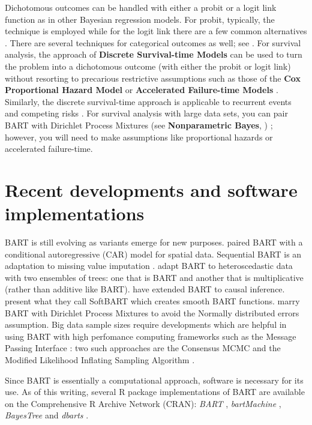 \documentclass[cmbright,doublespace]{WileySTAT-V1}
\theoremstyle{plain}
\begin{document}
Dichotomous outcomes can be handled with either a probit or a logit
link function as in other Bayesian regression models.  For probit,
typically, the \cite{AlbeChib93} technique is employed while for the
logit link there are a few common alternatives
\citep{HolmHeld06,FruhFruh10,GramPols12}.  There are several
techniques for categorical outcomes as well; see
\citep{AlbeChib93,McCuRoss94,McCuRoss00,FruhFruh10,KindWang16,Murr17}.
For survival analysis, the approach of \textbf{Discrete Survival-time
  Models} \citep{Fahr14} can be used to turn the problem into a
dichotomous outcome (with either the probit or logit link)
\citep{SparLoga16} without resorting to precarious restrictive
assumptions such as those of the \textbf{Cox Proportional Hazard
  Model} \citep{CaiZeng14} or \textbf{Accelerated Failure-time Models}
\citep{Jame14}.  Similarly, the discrete survival-time approach is
applicable to recurrent events \citep{SparRein18} and competing risks
\citep{SparLoga19}.  For survival analysis with large data sets, you
can pair BART with Dirichlet Process Mixtures (see
\textbf{Nonparametric Bayes}, \cite{Duns17})
\citep{BonaBala11,HendLoui17}; however, you will need to make
assumptions like proportional hazards or accelerated failure-time.

\section{Recent developments and software implementations}
\label{final}

BART is still evolving as variants emerge for new purposes.
\cite{ZhanShi07} paired BART with a conditional autoregressive (CAR)
model for spatial data. Sequential BART is an adaptation to missing
value imputation \citep{XuDani16}.  \cite{PratChip17} adapt BART to
heteroscedastic data with two ensembles of trees: one that is BART and
another that is multiplicative (rather than additive like BART).
\cite{HahnMurr17} have extended BART to causal inference.
\cite{LineYang18} present what they call SoftBART which creates smooth
BART functions.  \cite{GeorLaud19} marry BART with Dirichlet Process
Mixtures to avoid the Normally distributed errors assumption.  Big
data sample sizes require developments which are helpful in using BART
with high perfomance computing frameworks such as the Message Passing
Interface \citep{WalkDong96,GabrFagg04}: two such approaches are the
Consensus MCMC \citep{PratChip14} and the Modified Likelihood
Inflating Sampling Algorithm \citep{EnteCrai18}.

Since BART is essentially a computational approach, software is
necessary for its use.  As of this writing, several R package
implementations of BART are available on the Comprehensive R Archive
Network (CRAN): {\it BART} \citep{McCuSpar19}, {\it bartMachine}
\citep{BleiKape14}, {\it BayesTree} \citep{ChipMcCu16} and {\it
  dbarts} \citep{DoriChip16}.
\end{document}

